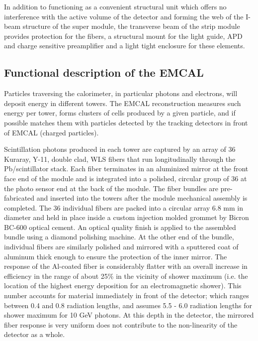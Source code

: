 In addition to functioning as a convenient structural unit which offers no interference with the active volume of the detector 
and forming the web of the I-beam structure of the super module, the transverse beam of the strip module provides protection for the fibers, 
a structural mount for the light guide, APD and charge sensitive preamplifier and a light tight enclosure for these elements.


\subsection{Functional description of the EMCAL}


Particles traversing the calorimeter, in particular photons and electrons, will deposit energy in different towers. 
The EMCAL reconstruction measures such energy per tower, forms clusters of cells produced by a given particle, 
and if possible matches them with particles detected by the tracking detectors in front of EMCAL (charged particles).

Scintillation photons produced in each tower are captured by an array of 36 Kuraray, 
Y-11, double clad, WLS fibers that run longitudinally through the Pb/scintillator stack.
Each fiber terminates in an aluminized mirror at the front face end of the module and is integrated into a polished, 
circular group of 36 at the photo sensor end at the back of the module. 
The fiber bundles are pre-fabricated and inserted into the towers after the module mechanical assembly is completed. 
The 36 individual fibers are packed into a circular array 6.8 mm in diameter and held in place inside a custom injection 
molded grommet by Bicron BC-600 optical cement. An optical quality finish is applied to the assembled bundle using a diamond polishing machine. 
At the other end of the bundle, individual fibers are similarly polished and mirrored with a sputtered coat 
of aluminum thick enough to ensure the protection of the inner mirror. 
The response of the Al-coated fiber is considerably flatter with an overall increase in efficiency in the range of about 25\% in the vicinity of shower maximum 
(i.e. the location of the highest energy deposition for an electromagnetic shower).  
This number accounts for material immediately in front of the detector; which ranges between 0.4 and 0.8 radiation lengths, 
and assumes 5.5 - 6.0 radiation lengths for shower maximum for 10 GeV photons. 
At this depth in the detector, the mirrored fiber response is very uniform does not contribute to the non-linearity of the detector as a whole. 


